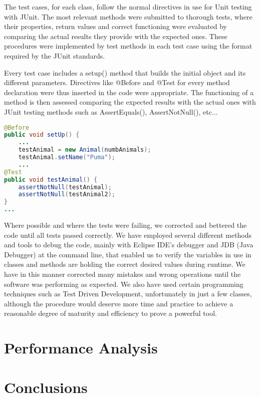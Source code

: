 \documentclass[11pt]{report}
\begin{document}
The test cases, for each class, follow the normal directives in use for Unit testing with JUnit. The most relevant methods were submitted to thorough tests, where their properties, return values and correct functioning were evaluated by comparing the actual results they provide with the expected ones. These procedures were implemented by test methods in each test case using the format required by the JUnit standards. 

Every test case includes a setup() method that builds the initial object and its different parameters. Directives like @Before and @Test for every method declaration were thus inserted in the code were appropriate. The functioning of a method is then assessed comparing the expected results with the actual ones with JUnit testing methods such as AssertEquals(), AssertNotNull(), etc...

\begin{lstlisting}[language=Java,caption= Use of JUnit directives in test cases]
@Before
public void setUp() {
    ...
    testAnimal = new Animal(numbAnimals);
    testAnimal.setName("Puma");
    ...
@Test
public void testAnimal() {
    assertNotNull(testAnimal);
    assertNotNull(testAnimal2);
} 
...
\end{lstlisting}

Where possible and where the tests were failing, we corrected and bettered the code until all tests passed correctly. We have employed several different methods and tools to debug the code, mainly with Eclipse IDE's debugger and JDB (Java Debugger) at the command line, that enabled us to verify the variables in use in classes and methods are holding the correct desired values during runtime. We have in this manner corrected many mistakes and wrong operations until the software was performing as expected. We also have used certain programming techniques such as Test Driven Development, unfortunately in just a few classes, although the procedure would deserve more time and practice to achieve a reasonable degree of maturity and efficiency to prove a powerful tool. 

\chapter{Performance Analysis}

   

\chapter{Conclusions} %
\end{document}
